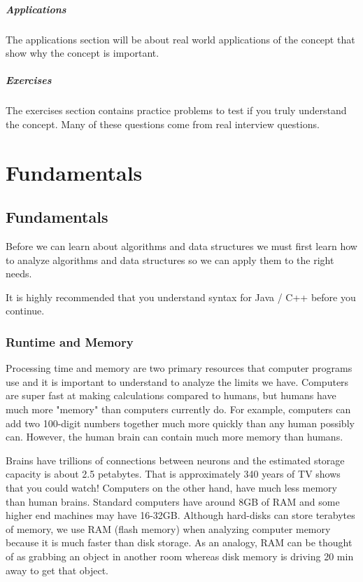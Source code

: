 \documentclass[11pt,oneside]{book}
\begin{document}
\subsubsection{Applications}

The applications section will be about real world applications of the concept that show why the concept is important.

\subsubsection{Exercises}

The exercises section contains practice problems to test if you truly understand the concept. Many of these questions come from real interview questions.

\part{ Fundamentals }
    \chapter{ Fundamentals }
        

Before we can learn about algorithms and data structures we must first learn how to analyze algorithms and data structures so we can apply them to the right needs.

It is highly recommended that you understand syntax for Java / C++ before you continue.


        \section{ Runtime and Memory }
        

Processing time and memory are two primary resources that computer programs use and it is important to understand to analyze the limits we have. Computers are super fast at making calculations compared to humans, but humans have much more "memory" than computers currently do. For example, computers can add two 100-digit numbers together much more quickly than any human possibly can. However, the human brain can contain much more memory than humans.

Brains have trillions of connections between neurons and the estimated storage capacity is about 2.5 petabytes. That is approximately 340 years of TV shows that you could watch! Computers on the other hand, have much less memory than human brains. Standard computers have around 8GB of RAM and some higher end machines may have 16-32GB. Although hard-disks can store terabytes of memory, we use RAM (flash memory) when analyzing computer memory because it is much faster than disk storage. As an analogy, RAM can be thought of as grabbing an object in another room whereas disk memory is driving 20 min away to get that object.
\end{document}
